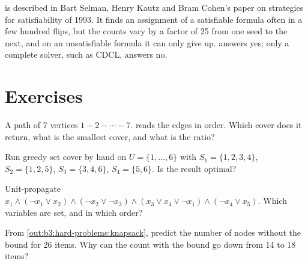 \label{out:b3:hard-problems:walksat}

 is described in Bart Selman, Henry Kautz and Bram Cohen's paper on  strategies for satisfiability of 1993. %
It finds an assignment of a satisfiable formula often in a few hundred flips, but the counts vary by a factor of 25 from one seed to the next, and on an unsatisfiable formula it can only give up.  answers yes; only a complete solver, such as CDCL, answers no.

\section{Exercises}\label{sec:b3:hard-problems:exercises}

\begin{exercise}[$\star$]\label{exo:b3:hard-problems:1}
A path of 7 vertices $1 - 2 - \cdots - 7$.  reads the edges in order. Which cover does it return, what is the smallest cover, and what is the ratio?
\end{exercise}

\begin{exercise}[$\star$]\label{exo:b3:hard-problems:2}
Run greedy set cover by hand on $U = \{1, \ldots, 6\}$ with $S_1 = \{1, 2, 3, 4\}$, $S_2 = \{1, 2, 5\}$, $S_3 = \{3, 4, 6\}$, $S_4 = \{5, 6\}$. Is the result optimal?
\end{exercise}

\begin{exercise}[$\star$]\label{exo:b3:hard-problems:3}
Unit-propagate $x_1 \wedge (\neg x_1 \vee x_2) \wedge (\neg x_2 \vee \neg x_3) \wedge (x_3 \vee x_4 \vee \neg x_1) \wedge (\neg x_4 \vee x_5)$. Which variables are set, and in which order?
\end{exercise}

\begin{exercise}[$\star$]\label{exo:b3:hard-problems:4}
From \cref{out:b3:hard-problems:knapsack}, predict the number of nodes without the bound for 26 items. Why can the count with the bound go down from 14 to 18 items?
\end{exercise}

